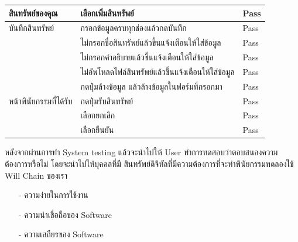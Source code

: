 \documentclass[12pt,oneside,openright,a4paper]{cpe-thai-project}
\begin{document}
\begin{table}[h]
\begin{tabular}{|l|l|l|}
สินทรัพย์ของคุณ        & เลือกเพิ่มสินทรัพย์                              &      Pass  \\ \hline                
บันทึกสินทรัพย์        & กรอกข้อมูลครบทุกช่องแล้วกดบันทึก                      &     Pass   \\ \hline
                       & ไม่กรอกชื่อสินทรัพย์แล้วขึ้นแจ้งเตือนให้ใส่ข้อมูล                                &  Pass      \\ \hline
                       & ไม่กรอกคำอธิบายแล้วขึ้นแจ้งเตือนให้ใส่ข้อมูล                          &    Pass   \\ \hline
                       & ไม่อัพโหลดไฟล์สินทรัพย์แล้วขึ้นแจ้งเตือนให้ใส่ข้อมูล                       & Pass       \\ \hline                    
                        & กดปุ่มล้างข้อมูล แล้วล้างข้อมูลในฟอร์มที่กรอกมา       &Pass        \\ \hline        
หน้าพินัยกรรมที่ได้รับ & กดปุ่มรับสินทรัพย์                              & Pass      \\ \hline
                       & เลือกยกเลิก                           &    Pass    \\ \hline
                       & เลือกยืนยัน                     & Pass       \\ \hline
\end{tabular}
\end{table}
\tab หลังจากผ่านการทำ System testing แล้วจะนำไปให้ User ทำการทดสอบว่าตอบสนองความต้องการหรือไม่ โดยจะนำไปให้บุคคลที่มี สินทรัพย์ดิจิทัลที่มีความต้องการที่จะทำพินัยกรรมทดลองใช้ Will Chain ของเรา

\begin{itemize}
	\item[-] ความง่ายในการใช้งาน
	\item[-]  ความน่าเชื่อถือของ Software
	\item[-]  ความเสถียรของ Software
\end{itemize}
\clearpage
\end{document}

